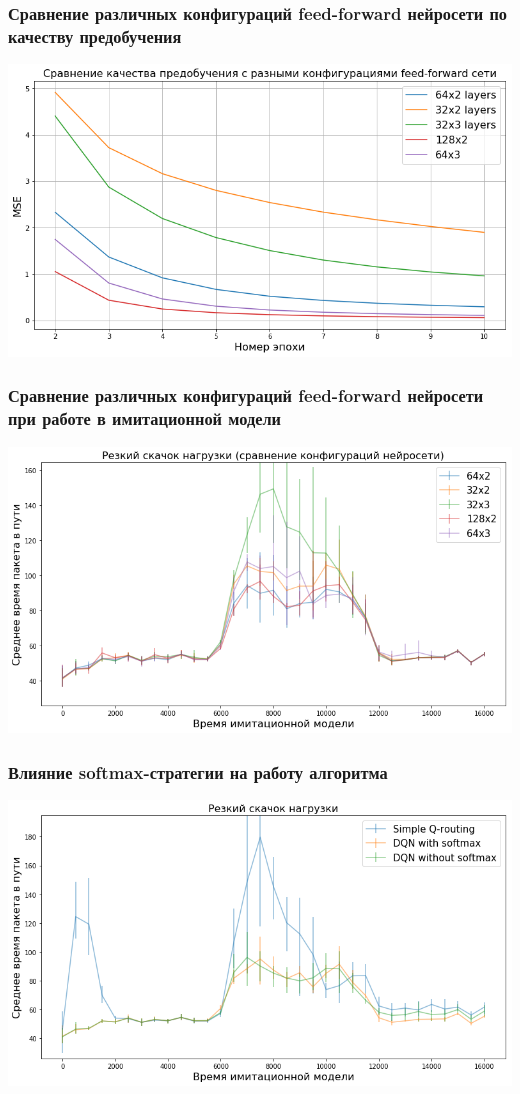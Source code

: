 \documentclass{beamer}
\begin{document}
\begin{frame}
  \frametitle{Сравнение различных конфигураций feed-forward нейросети по
    качеству предобучения}
  \includegraphics[width=\textwidth]{experiment-layers-pretrain}
\end{frame}

\begin{frame}
  \frametitle{Сравнение различных конфигураций feed-forward нейросети при работе
    в имитационной модели}
  \includegraphics[width=\textwidth]{experiment-layers-launch}
\end{frame}

\begin{frame}
  \frametitle{Влияние softmax-стратегии на работу алгоритма}
  \includegraphics[width=\textwidth]{experiment-softmax-effect}
\end{frame}
\end{document}
